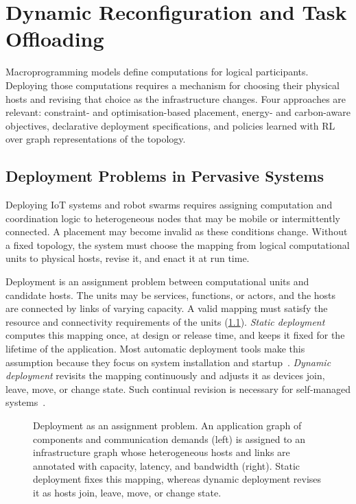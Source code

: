 \chapter{Dynamic Reconfiguration and Task Offloading}
\label{chap:dynamic-reconfiguration}

Macroprogramming models define computations for logical participants.
Deploying those computations requires a mechanism for choosing their physical hosts
and revising that choice as the infrastructure changes.
%
Four approaches are relevant:
constraint- and optimisation-based placement,
energy- and carbon-aware objectives,
declarative deployment specifications,
and policies learned with \ac{RL} over graph representations of the topology.

\section{Deployment Problems in Pervasive Systems}
\label{sec:the-deployment-problem}

Deploying IoT systems and robot swarms requires assigning computation and coordination logic to heterogeneous nodes that may be mobile or intermittently connected.
A placement may become invalid as these conditions change.
%
Without a fixed topology,
the system must choose the mapping from logical computational units to physical hosts,
revise it,
and enact it at run time.

Deployment is an assignment problem between computational units and candidate hosts.
The units may be services, functions, or actors, and the hosts are connected by links of varying capacity.
A valid mapping must satisfy the resource and connectivity requirements of the units (\cref{fig:placement-mapping}).
%
\emph{Static deployment} computes this mapping once, at design or release time, and keeps it fixed for the lifetime of the application.
Most automatic deployment tools make this assumption because they focus on system installation and startup~\cite{DBLP:journals/jss/ArcangeliBL15}.
%
\emph{Dynamic deployment} revisits the mapping continuously
and adjusts it as devices join,
leave,
move,
or change state.
Such continual revision is necessary for self-managed systems~\cite{DBLP:conf/icse/KramerM07}.

\begin{figure}[t]
    \centering
    
    \caption[Deployment as an assignment problem between two graphs]{Deployment as an assignment problem. An application graph of components and communication demands (left) is assigned to an infrastructure graph whose heterogeneous hosts and links are annotated with capacity, latency, and bandwidth (right). Static deployment fixes this mapping, whereas dynamic deployment revises it as hosts join, leave, move, or change state.}
    \label{fig:placement-mapping}
\end{figure}

